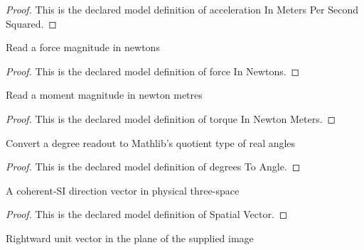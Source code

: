 \begin{proof}
  This is the declared model definition of acceleration In Meters Per Second Squared.
\end{proof}
\begin{definition}
  \label{def:physics:phyx-mini-0953:phyxminiproblems-problemphyxmini0953-forceinnewtons}
  Read a force magnitude in newtons
\end{definition}
\begin{proof}
  This is the declared model definition of force In Newtons.
\end{proof}
\begin{definition}
  \label{def:physics:phyx-mini-0953:phyxminiproblems-problemphyxmini0953-torqueinnewtonmeters}
  Read a moment magnitude in newton metres
\end{definition}
\begin{proof}
  This is the declared model definition of torque In Newton Meters.
\end{proof}
\begin{definition}
  \label{def:physics:phyx-mini-0953:phyxminiproblems-problemphyxmini0953-degreestoangle}
  Convert a degree readout to Mathlib's quotient type of real angles
\end{definition}
\begin{proof}
  This is the declared model definition of degrees To Angle.
\end{proof}
\begin{definition}
  \label{def:physics:phyx-mini-0953:phyxminiproblems-problemphyxmini0953-spatialvector}
  A coherent-SI direction vector in physical three-space
\end{definition}
\begin{proof}
  This is the declared model definition of Spatial Vector.
\end{proof}
\begin{definition}
  \label{def:physics:phyx-mini-0953:phyxminiproblems-problemphyxmini0953-rightwardunitvector}
  Rightward unit vector in the plane of the supplied image
\end{definition}
